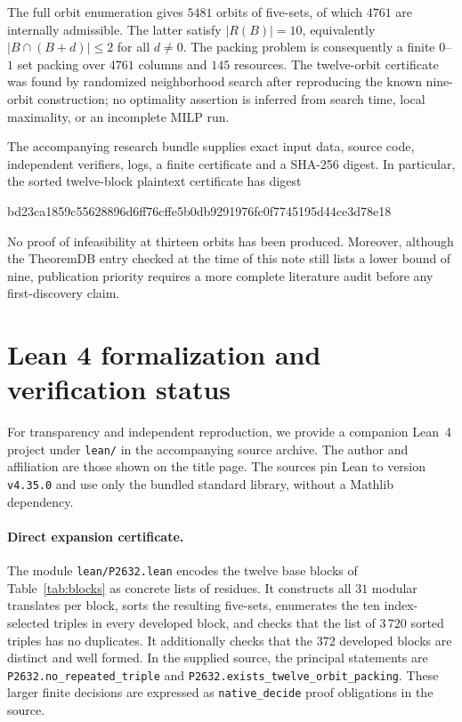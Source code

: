 \documentclass[11pt,a4paper]{article}
\begin{document}
The full orbit enumeration gives $5481$ orbits of five-sets, of which
$4761$ are internally admissible. The latter satisfy
$|R(B)|=10$, equivalently $|B\cap(B+d)|\leq2$ for all $d\ne0$.
The packing problem is consequently a finite $0$--$1$ set packing over
$4761$ columns and $145$ resources. The twelve-orbit certificate was
found by randomized neighborhood search after reproducing the known
nine-orbit construction; no optimality assertion is inferred from
search time, local maximality, or an incomplete MILP run.

The accompanying research bundle supplies exact input data,
source code, independent verifiers, logs, a finite certificate and a
SHA-256 digest. In particular, the sorted twelve-block plaintext
certificate has digest
\begin{center}
\ttfamily\footnotesize
bd23ca1859c55628896d6ff76cffe5b0db9291976fc0f7745195d44ce3d78e18
\end{center}
No proof of infeasibility at thirteen orbits has been produced.
Moreover, although the TheoremDB entry checked at the time of this note
still lists a lower bound of nine, publication priority requires a more
complete literature audit before any first-discovery claim.


\section{Lean 4 formalization and verification status}\label{sec:lean}
For transparency and independent reproduction, we provide a companion
Lean~4 project under \texttt{lean/} in the accompanying source archive.
The author and affiliation are those shown on the title page. The sources
pin Lean to version \texttt{v4.35.0} and use only the bundled standard
library, without a Mathlib dependency.

\paragraph{Direct expansion certificate.}
The module \texttt{lean/P2632.lean} encodes the twelve base blocks of
Table~\ref{tab:blocks} as concrete lists of residues. It constructs all
$31$ modular translates per block, sorts the resulting five-sets,
enumerates the ten index-selected triples in every developed block, and
checks that the list of $3\,720$ sorted triples has no duplicates.
It additionally checks that the $372$ developed blocks are distinct and
well formed. In the supplied source, the principal statements are
\texttt{P2632.no\_repeated\_triple} and
\texttt{P2632.exists\_twelve\_orbit\_packing}.
These larger finite decisions are expressed as
\texttt{native\_decide} proof obligations in the source.
\end{document}
